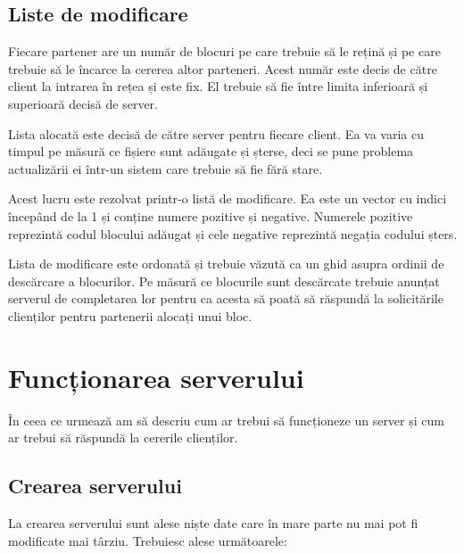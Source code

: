\documentclass[a4wide,12pt]{report}
\begin{document}
\section{Liste de modificare} %
\label{sec:limod}

Fiecare partener are un număr de blocuri pe care trebuie să le rețină și pe care trebuie să le încarce la cererea altor
parteneri. Acest număr este decis de către client la intrarea în rețea și este fix. El trebuie să fie între limita
inferioară și superioară decisă de server.

Lista alocată este decisă de către server pentru fiecare client. Ea va varia cu timpul pe măsură ce fișiere sunt
adăugate și șterse, deci se pune problema actualizării ei într-un sistem care trebuie să fie fără stare.

Acest lucru este rezolvat printr-o listă de modificare. Ea este un vector cu indici începând de la 1 și conține numere
pozitive și negative. Numerele pozitive reprezintă codul blocului adăugat și cele negative reprezintă negația codului
șters.

Lista de modificare este ordonată și trebuie văzută ca un ghid asupra ordinii de descărcare a blocurilor. Pe măsură ce
blocurile sunt descărcate trebuie anunțat serverul de completarea lor pentru ca acesta să poată să răspundă la
solicitările clienților pentru partenerii alocați unui bloc.

\chapter{Funcționarea serverului}

În ceea ce urmează am să descriu cum ar trebui să funcționeze un server și cum ar trebui să răspundă la cererile
clienților.

\section{Crearea serverului} %

La crearea serverului sunt alese niște date care în mare parte nu mai pot fi modificate mai târziu. Trebuiesc alese
următoarele:
\end{document}
